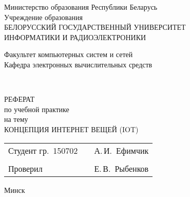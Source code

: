 \begin{titlepage}
    \begin{center}
      Министерство образования Республики Беларусь\\[1em]
      Учреждение образования\\
      БЕЛОРУССКИЙ ГОСУДАРСТВЕННЫЙ УНИВЕРСИТЕТ\\
      ИНФОРМАТИКИ И РАДИОЭЛЕКТРОНИКИ\\[2em]
  
      \begin{minipage}{\textwidth}
        \begin{flushleft}
          Факультет компьютерных систем и сетей\\[1em]
          Кафедра электронных вычислительных средств\\[1em]
        \end{flushleft}
      \end{minipage}\\[1em]
      
      \vfill

      {РЕФЕРАТ}\\
      {по учебной практике}\\
      {на тему}\\[1em]
      \MakeUppercase{Концепция Интернет вещей (IoT)}\\[1em]

      \vfill

      \begin{tabular}{p{}p{}p{}}
        Студент гр.~150702     &&   А.\,И.~Ефимчик     \\
                               &&                     \\
        Проверил               &&   Е.\,В.~Рыбенков   \\
      \end{tabular}
      
      \vfill

      {\normalsize Минск \the\year}
    \end{center}
\end{titlepage}